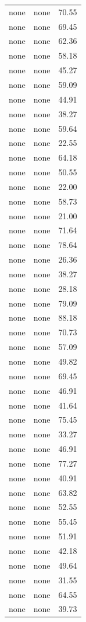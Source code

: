 \begin{tabular}{rrr}
none & none & 70.55 \\
none & none & 69.45 \\
none & none & 62.36 \\
none & none & 58.18 \\
none & none & 45.27 \\
none & none & 59.09 \\
none & none & 44.91 \\
none & none & 38.27 \\
none & none & 59.64 \\
none & none & 22.55 \\
none & none & 64.18 \\
none & none & 50.55 \\
none & none & 22.00 \\
none & none & 58.73 \\
none & none & 21.00 \\
none & none & 71.64 \\
none & none & 78.64 \\
none & none & 26.36 \\
none & none & 38.27 \\
none & none & 28.18 \\
none & none & 79.09 \\
none & none & 88.18 \\
none & none & 70.73 \\
none & none & 57.09 \\
none & none & 49.82 \\
none & none & 69.45 \\
none & none & 46.91 \\
none & none & 41.64 \\
none & none & 75.45 \\
none & none & 33.27 \\
none & none & 46.91 \\
none & none & 77.27 \\
none & none & 40.91 \\
none & none & 63.82 \\
none & none & 52.55 \\
none & none & 55.45 \\
none & none & 51.91 \\
none & none & 42.18 \\
none & none & 49.64 \\
none & none & 31.55 \\
none & none & 64.55 \\
none & none & 39.73 \\

\end{tabular}
